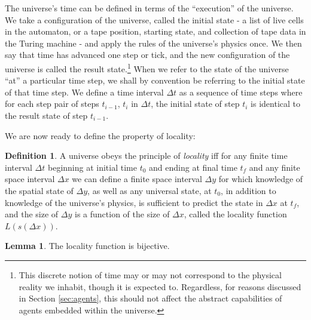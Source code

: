 \documentclass[12pt]{article}
\theoremstyle{definition}
\newtheorem{defn}{Definition}
\newtheorem{lem}{Lemma}
\begin{document}
The universe's time can be defined in terms of the ``execution'' of the
universe. We take a configuration of the universe, called the initial state - a
list of live cells in the automaton, or a tape position, starting state, and
collection of tape data in the Turing machine - and apply the rules of the
universe's physics once. We then say that time has advanced one step or tick,
and the new configuration of the universe is called the result
state.\footnote{This discrete notion of time may or may not correspond to the
physical reality we inhabit, though it is expected to. Regardless, for reasons
discussed in Section \ref{sec:agents}, this should not affect the abstract
capabilities of agents embedded within the universe.} When we refer to the state
of the universe ``at'' a particular time step, we shall by convention be
referring to the initial state of that time step. We define a time interval
\(\Delta t\) as a sequence of time steps where for each step pair of steps
\(t_{i-1}\), \(t_i\) in \(\Delta t\), the initial state of step \(t_i\) is
identical to the result state of step \(t_{i-1}\).



We are now ready to define the property of locality:

\begin{defn}

   A universe obeys the principle of \textit{locality} iff for any finite time
   interval \(\Delta t\) beginning at initial time \(t_0\) and ending at final
   time \(t_f\) and any finite space interval \(\Delta x\) we can define a
   finite space interval \(\Delta y\) for which knowledge of the spatial state
   of \(\Delta y\), as well as any universal state, at \(t_0\), in addition to
   knowledge of the universe's physics, is sufficient to predict the state in
   \(\Delta x\) at \(t_f\), and the size of \(\Delta y\) is a function of the
   size of \(\Delta x\), called the locality function \(L(s(\Delta x))\).

\end{defn}

\begin{lem}
   The locality function is bijective.
\end{lem}
\end{document}

